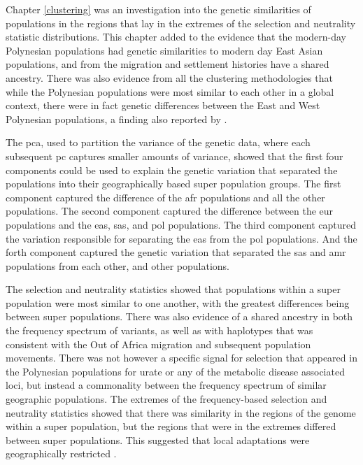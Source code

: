 \documentclass[]{report}
\begin{document}
Chapter \ref{clustering} was an investigation into the genetic
similarities of populations in the regions that lay in the extremes of
the selection and neutrality statistic distributions. This chapter added
to the evidence that the modern-day Polynesian populations had genetic
similarities to modern day East Asian populations, and from the
migration and settlement histories have a shared ancestry. There was
also evidence from all the clustering methodologies that while the
Polynesian populations were most similar to each other in a global
context, there were in fact genetic differences between the East and
West Polynesian populations, a finding also reported by
\citet{Hudjashov2018}.

The \glsdesc{pca}, used to partition the variance of the genetic data,
where each subsequent \glsdesc{pc} captures smaller amounts of variance,
showed that the first four components could be used to explain the
genetic variation that separated the populations into their
geographically based super population groups. The first component
captured the difference of the \gls{afr} populations and all the other
populations. The second component captured the difference between the
\gls{eur} populations and the \gls{eas}, \gls{sas}, and \gls{pol}
populations. The third component captured the variation responsible for
separating the \gls{eas} from the \gls{pol} populations. And the forth
component captured the genetic variation that separated the \gls{sas}
and \gls{amr} populations from each other, and other populations.

The selection and neutrality statistics showed that populations within a
super population were most similar to one another, with the greatest
differences being between super populations. There was also evidence of
a shared ancestry in both the frequency spectrum of variants, as well as
with haplotypes that was consistent with the Out of Africa migration and
subsequent population movements. There was not however a specific signal
for selection that appeared in the Polynesian populations for urate or
any of the metabolic disease associated loci, but instead a commonality
between the frequency spectrum of similar geographic populations. The
extremes of the frequency-based selection and neutrality statistics
showed that there was similarity in the regions of the genome within a
super population, but the regions that were in the extremes differed
between super populations. This suggested that local adaptations were
geographically restricted \citep{Gravel2011}.
\end{document}
